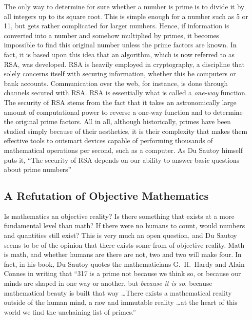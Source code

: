 \documentclass{mathbook}
\begin{document}
    The only way to determine for sure whether a number is prime is to divide it by all integers up to its square root. This is simple enough for a number such as 5 or 11, but gets rather complicated for larger numbers. Hence, if information is converted into a number and somehow multiplied by primes, it becomes impossible to find this original number unless the prime factors are known. In fact, it is based upon this idea that an algorithm, which is now referred to as RSA, was developed. RSA is heavily employed in cryptography, a discipline that solely concerns itself with securing information, whether this be computers or bank accounts. Communication over the web, for instance, is done through channels secured with RSA. RSA is essentially what is called a \emph{one-way} function. \cite{Lake2018} The security of RSA stems from the fact that it takes an astronomically large amount of computational power to reverse a one-way function and to determine the original prime factors. All in all, although historically, primes have been studied simply because of their aesthetics, it is their complexity that makes them effective tools to outsmart devices capable of performing thousands of mathematical operations per second, such as a computer. As Du Sautoy himself puts it, ``The security of RSA depends on our ability to answer basic questions about prime numbers'' \cite[p.~12]{Sautoy2003}

    \subsection{A Refutation of Objective Mathematics}

    Is mathematics an objective reality? Is there something that exists at a more fundamental level than math? If there were no humans to count, would numbers and quantities still exist? This is very much an open question, and Du Sautoy seems to be of the opinion that there exists some from of objective reality. Math is math, and whether humans are there are not, two and two will make four. In fact, in his book, Du Sautoy quotes the mathematicians G.~H.~Hardy and Alain Connes in writing that ``317 is a prime not because we think so, or because our minds are shaped in one way or another, but \emph{because it is so}, because mathematical beauty is built that way \dots There exists a mathematical reality outside of the human mind, a raw and immutable reality \dots at the heart of this world we find the unchaining list of primes.'' \cite[p.~7]{Sautoy2003} \par
\end{document}
